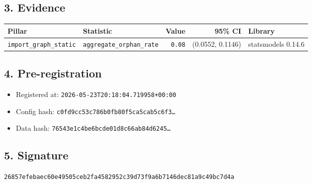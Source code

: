 \documentclass{article}
\begin{document}
\subsection*{3. Evidence}
\begin{tabular}{llrrl}\toprule
\textbf{Pillar} & \textbf{Statistic} & \textbf{Value} & \textbf{95\% CI} & \textbf{Library} \\\midrule
\texttt{import\_graph\_static} & \texttt{aggregate\_orphan\_rate} & \texttt{0.08} & (0.0552, 0.1146) & statsmodels 0.14.6 \\
\bottomrule\end{tabular}
\subsection*{4. Pre-registration}
\begin{itemize}
\item Registered at: \texttt{2026-05-23T20:18:04.719958+00:00}
\item Config hash: \texttt{c0fd9cc53c786b0fb80f5ca5cab5c6f3\dots}
\item Data hash: \texttt{76543e1c4be6bcde01d8c66ab84d6245\dots}
\end{itemize}
\subsection*{5. Signature}
\texttt{26857efebaec60e49505ceb2fa4582952c39d73f9a6b7146dec81a9c49bc7d4a}\\
\end{document}
